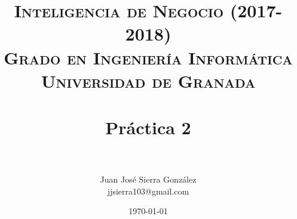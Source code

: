 

\title{	
	\normalfont \normalsize 
	\textsc{\textbf{Inteligencia de Negocio (2017-2018)} \\ Grado en Ingeniería Informática \\ Universidad de Granada} \\ [25pt] 
	\horrule{0.5pt} \\[0.4cm]
	\huge Práctica 2 \\
	\horrule{2pt} \\[0.5cm]
}

\author{Juan José Sierra González \\ jjsierra103@gmail.com}

\date{\normalsize\today}


	\maketitle
	\thispagestyle{empty}
	
	\newpage
	
	\tableofcontents
	
	\listoffigures
	
	\listoftables
	
	\newpage
	
